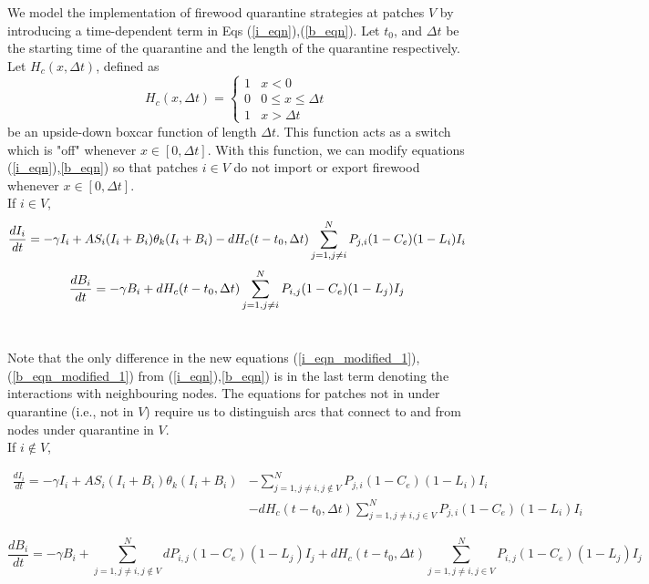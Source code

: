 We model the implementation of firewood quarantine strategies at patches $V$ by introducing a time-dependent term in Eqs (\ref{i_eqn}),(\ref{b_eqn}). Let $t_0$, and $\Delta t$ be the starting time of the quarantine and the length of the quarantine respectively. Let $H_c(x,\Delta t)$, defined as
$$H_c(x,\Delta t) = 
\begin{cases} 
      1 & x<0 \\
      0 & 0\leq x\leq \Delta t \\
      1 & x > \Delta t
\end{cases}
$$
be an upside-down boxcar function of length $\Delta t$. This function acts as a switch which is "off" whenever $x \in [0,\Delta t]$. With this function, we can modify equations (\ref{i_eqn}),\ref{b_eqn}) so that patches $i\in V$ do not import or export firewood whenever $x \in [0,\Delta t]$.
\newline\\
If $i \in V$,
\footnotesize{
\begin{equation}
\frac{d I_i}{dt} = -\gamma I_i+ A S_i (I_i+ B_i)\theta_k(I_i+ B_i)- dH_c(t - t_0,\Delta t)\sum_{j = 1, j\neq i}^N P_{j,i} (1 - C_e) (1 - L_i)I_i
\protect \label{i_eqn_modified_1}
\end{equation}
\begin{equation}
\frac{d B_i}{dt} = -\gamma B_i+dH_c(t - t_0,\Delta t)\sum_{j = 1, j\neq i}^N P_{i,j} (1 - C_e) (1 - L_j)I_j
\protect \label{b_eqn_modified_1}
\end{equation}}
\newline\\
\normalsize

Note that the only difference in the new equations (\ref{i_eqn_modified_1}),(\ref{b_eqn_modified_1}) from (\ref{i_eqn}),\ref{b_eqn}) is in the last term denoting the interactions with neighbouring nodes. The equations for patches not in under quarantine (i.e., not in $V$) require us to distinguish arcs that connect to and from nodes under quarantine in $V$.
\newline\\
If $i \notin V$,
\footnotesize{
\begin{align}
\label{i_eqn_modified_2}
\frac{d I_i}{dt} = -\gamma I_i+ A S_i (I_i+ B_i)\theta_k(I_i+ B_i) &- \sum_{j = 1, j\neq i, j \notin V}^N P_{j,i} (1 - C_e) (1 - L_i)I_i\\ &-  dH_c(t - t_0,\Delta t)\sum_{j = 1, j\neq i, j \in V}^N P_{j,i} (1 - C_e) (1 - L_i)I_i \nonumber
\end{align}


\begin{equation}
\frac{d B_i}{dt} = -\gamma B_i+ \sum_{j = 1, j\neq i, j\notin V}^N d P_{i,j} (1 - C_e) (1 - L_j)I_j  +dH_c(t - t_0,\Delta t)\sum_{j = 1, j\neq i, j\in V}^N P_{i,j} (1 - C_e) (1 - L_j)I_j 
\label{b_eqn_modified_2}
\end{equation}}
\normalsize

